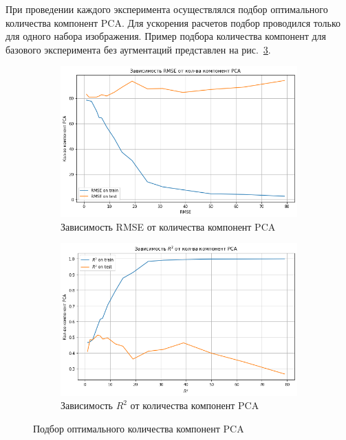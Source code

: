 \documentclass[a4paper,14pt]{article}
\begin{document}
    При проведении каждого эксперимента осуществлялся подбор оптимального количества компонент PCA.
    Для ускорения расчетов подбор проводился только для одного набора изображения. 
    Пример подбора количества компонент для базового эксперимента без аугментаций представлен на рис.~\ref{fig:pca_optim}.
    
    \begin{figure}[H]
    	\centering
    	\begin{subfigure}{.5\textwidth}
    		\centering
    		\includegraphics[width=\linewidth]{images/pca_rmse}
    		\caption{Зависимость RMSE от количества компонент PCA}
    		\label{fig:pca_rmse}
    	\end{subfigure}%
    	\begin{subfigure}{.5\textwidth}
    		\centering
    		\includegraphics[width=\linewidth]{images/pca_r2}
    		\caption{Зависимость $R^2$ от количества компонент PCA}
    		\label{fig:pca_r2}
    	\end{subfigure}
    	\caption{Подбор оптимального количества компонент PCA}
    	\label{fig:pca_optim}
    \end{figure}
    
\end{document}
